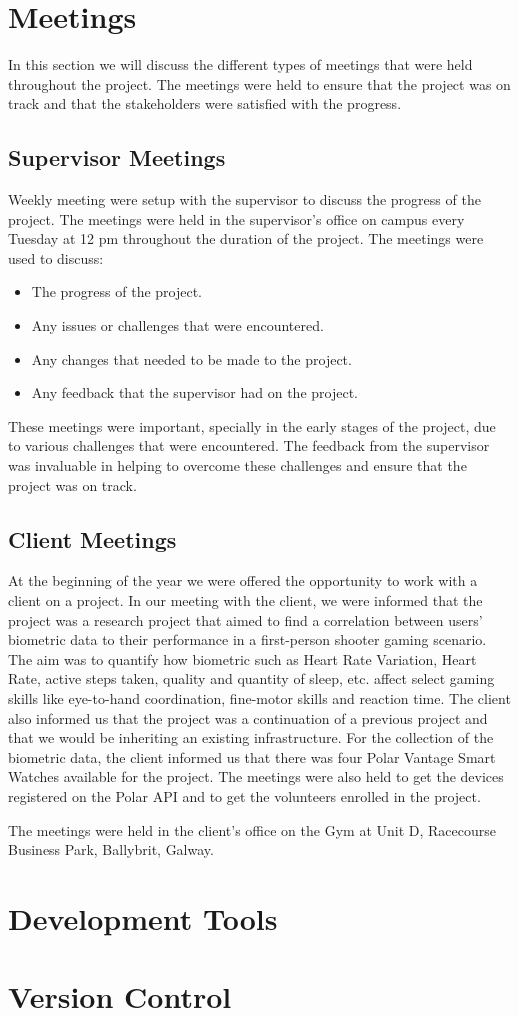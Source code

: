 \section{Meetings}
In this section we will discuss the different types of meetings that were held throughout the project. The meetings were held to ensure that the project was on track
and that the stakeholders were satisfied with the progress.

\subsection{Supervisor Meetings}
Weekly meeting were setup with the supervisor to discuss the progress of the project. The meetings were held in the supervisor's office on campus every Tuesday at 12 pm throughout
the duration of the project. The meetings were used to discuss:

\begin{itemize}
    \item The progress of the project.
    \item Any issues or challenges that were encountered.
    \item Any changes that needed to be made to the project.
    \item Any feedback that the supervisor had on the project.
\end{itemize}

These meetings were important, specially in the early stages of the project, due to various challenges that were encountered. The feedback from the supervisor was invaluable
in helping to overcome these challenges and ensure that the project was on track. 

\subsection{Client Meetings}

At the beginning of the year we were offered the opportunity to work with a client on a project. In our meeting with the client, we were informed that the project
was a research project that aimed to find a correlation between users' biometric data to their performance in a first-person shooter gaming scenario. The aim was to quantify
how biometric such as Heart Rate Variation, Heart Rate, active steps taken, quality and quantity of sleep, etc. affect select gaming skills like eye-to-hand coordination, fine-motor skills and reaction time.
The client also informed us that the project was a continuation of a previous project and that we would be inheriting an existing infrastructure. 
For the collection of the biometric data, the client informed us that there was four Polar Vantage Smart Watches available for the project. The meetings were also held to get
the devices registered on the Polar API and to get the volunteers enrolled in the project. 

The meetings were held in the client's office on the Gym at Unit D, Racecourse Business Park, Ballybrit, Galway. 


\section{Development Tools}

\section{Version Control}
